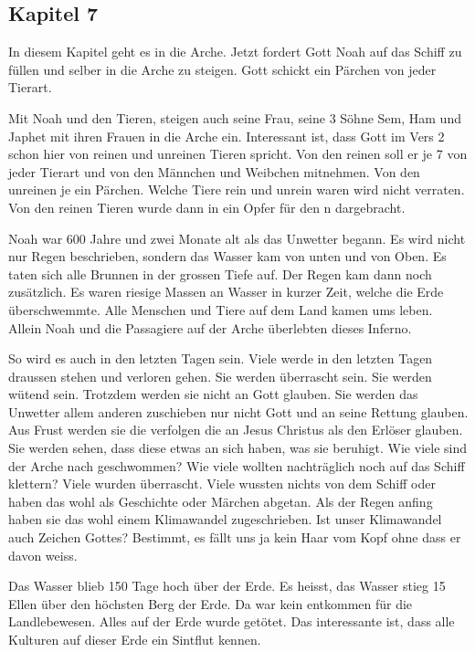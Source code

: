 \subsection{Kapitel 7}
In diesem Kapitel geht es in die Arche. Jetzt fordert Gott Noah auf das Schiff zu füllen und selber in die Arche zu steigen. Gott schickt ein Pärchen von jeder Tierart.

Mit Noah und den Tieren, steigen auch seine Frau, seine 3 Söhne Sem, Ham und Japhet mit ihren Frauen in die Arche ein. Interessant ist, dass Gott im Vers 2 schon hier von reinen und unreinen Tieren spricht. Von den reinen soll er je 7 von jeder Tierart und von den Männchen und Weibchen mitnehmen. Von den unreinen je ein Pärchen. Welche Tiere rein und unrein waren wird nicht verraten. Von den reinen Tieren wurde dann in  ein Opfer für den \herr n dargebracht.

Noah war 600 Jahre und zwei Monate alt als das Unwetter begann. Es wird nicht nur Regen beschrieben, sondern das Wasser kam von unten und von Oben. Es taten sich alle Brunnen in der grossen Tiefe auf. Der Regen kam dann noch zusätzlich. Es waren riesige Massen an Wasser in kurzer Zeit, welche die Erde überschwemmte. Alle Menschen und Tiere auf dem Land kamen ums leben. Allein Noah und die Passagiere auf der Arche überlebten dieses Inferno.

So wird es auch in den letzten Tagen sein. Viele werde in den letzten Tagen draussen stehen und verloren gehen. Sie werden überrascht sein. Sie werden wütend sein. Trotzdem werden sie nicht an Gott glauben. Sie werden das Unwetter allem anderen zuschieben nur nicht Gott und an seine Rettung glauben. Aus Frust werden sie die verfolgen die an Jesus Christus als den Erlöser glauben. Sie werden sehen, dass diese etwas an sich haben, was sie beruhigt. Wie viele sind der Arche nach geschwommen? Wie viele wollten nachträglich noch auf das Schiff klettern? Viele wurden überrascht. Viele wussten nichts von dem Schiff oder haben das wohl als Geschichte oder Märchen abgetan. Als der Regen anfing haben sie das wohl einem Klimawandel zugeschrieben. Ist unser Klimawandel auch Zeichen Gottes? Bestimmt, es fällt uns ja kein Haar vom Kopf ohne dass er davon weiss.

Das Wasser blieb 150 Tage hoch über der Erde. Es heisst, das Wasser stieg 15 Ellen über den höchsten Berg der Erde. Da war kein entkommen für die Landlebewesen. Alles auf der Erde wurde getötet. Das interessante ist, dass alle Kulturen auf dieser Erde ein Sintflut kennen.

